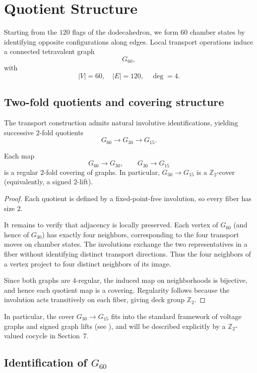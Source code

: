 \section{Quotient Structure}

Starting from the $120$ flags of the dodecahedron, we form $60$ chamber states
by identifying opposite configurations along edges. Local transport operations
induce a connected tetravalent graph
\[
G_{60},
\]
with
\[
|V| = 60, \quad |E| = 120, \quad \deg = 4.
\]

\subsection{Two-fold quotients and covering structure}

The transport construction admits natural involutive identifications,
yielding successive $2$-fold quotients
\[
G_{60} \longrightarrow G_{30} \longrightarrow G_{15}.
\]

\begin{proposition}
Each map
\[
G_{60} \to G_{30}, \qquad G_{30} \to G_{15}
\]
is a regular $2$-fold covering of graphs. In particular,
$G_{30} \to G_{15}$ is a $\mathbb{Z}_2$-cover (equivalently, a signed
$2$-lift).
\end{proposition}

\begin{proof}
Each quotient is defined by a fixed-point-free involution, so every fiber
has size $2$.

It remains to verify that adjacency is locally preserved. Each vertex of
$G_{60}$ (and hence of $G_{30}$) has exactly four neighbors, corresponding
to the four transport moves on chamber states. The involutions exchange
the two representatives in a fiber without identifying distinct transport
directions. Thus the four neighbors of a vertex project to four distinct
neighbors of its image.

Since both graphs are $4$-regular, the induced map on neighborhoods is
bijective, and hence each quotient map is a covering. Regularity follows
because the involution acts transitively on each fiber, giving deck group
$\mathbb{Z}_2$.
\end{proof}

In particular, the cover $G_{30} \to G_{15}$ fits into the standard framework
of voltage graphs and signed graph lifts (see \cite{gross_tucker,zaslavsky}),
and will be described explicitly by a $\mathbb{Z}_2$-valued cocycle in
Section~7.

\subsection{Identification of $G_{60}$}

